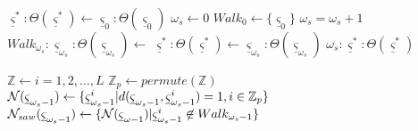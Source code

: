 \begin{algorithm}[!T]
\begin{footnotesize}
\vspace{0.2cm}
\begin{minipage}[!T]{0.49\linewidth}
\begin{algorithmic}[1]
    \STATE ${\underline \varsigma^*}\!:\!\Theta({\underline \varsigma^*}) \gets {\underline \varsigma}_0\!:\!\Theta({\underline \varsigma}_0)$
\ENDIF
\STATE $\omega_{s} \gets 0$     
\STATE $Walk_{0} \gets \{ {\underline \varsigma}_0 \}$
    \ENDIF
    \STATE $\omega_{s}=\omega_{s}+1$
    \STATE $Walk_{\omega_{s}}\!:\!{\underline \varsigma}_{\omega_{s}}\!:\!\Theta({\underline \varsigma}_{\omega_{s}}) \gets$
       \STATE ${\underline \varsigma^*}\!:\!\Theta({\underline \varsigma^*}) \gets {\underline \varsigma_{\omega_{s}}}\!:\!\Theta({\underline \varsigma}_{\omega_{s}})$
     \ENDIF
\ENDWHILE
{} $\omega_{s}\!:\!{\underline \varsigma^*}\!:\!\Theta({\underline \varsigma^*})$
\ENDPROCEDURE
\end{algorithmic}
\end{minipage}
\begin{minipage}[!T]{0.49\linewidth}
\label{fg_global_search_c}
\begin{algorithmic}[1]
\STATE $\mathbb{Z} \gets i = 1,2, \ldots ,L $ 
\STATE $\mathbb{Z}_p \gets permute(\mathbb{Z}) $ 
\STATE ${\cal N} ({\underline \varsigma}_{\omega_{s} -1}) \gets  \{{\underline \varsigma}_{\omega_{s} -1}^i | d({\underline \varsigma}_{\omega_{s} -1}, {\underline \varsigma}_{\omega_{s} -1}^i ) = 1, i \in \mathbb{Z}_p\}$ 
\STATE ${\cal N}_{saw} ({\underline \varsigma}_{\omega_{s} -1}) \gets  \{ {\cal N} ({\underline \varsigma}_{\omega -1}) |
                      {\underline \varsigma}_{\omega_{s} -1}^i \not\in  Walk_{\omega_{s} -1}\}$

\end{algorithmic}
\end{minipage}
\end{footnotesize}
\end{algorithm}

